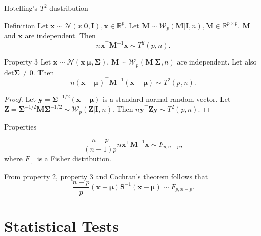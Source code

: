 \documentclass{beamer}
\begin{document}
\begin{frame}{Hotelling's $T^2$ dustribution}
    \begin{block}{Definition}
        Let $\mathbf{x} \sim \mathcal{N}(x|\mathbf{0}, \mathbf{I}), \mathbf{x}\in \mathbb{R}^p$.
        Let $\mathbf{M} \sim \mathcal{W}_p(\mathbf{M}|\mathbf{I}, n), \mathbf{M} \in \mathbb{R}^{p\times p}$.
        $\mathbf{M}$ and $\mathbf{x}$ are independent. Then
        \[
            n\mathbf{x}^\top\mathbf{M}^{-1}\mathbf{x} \sim T^2(p, n).
        \]
    \end{block}

    \begin{block}{Property 3}
        Let $\mathbf{x} \sim \mathcal{N}(\boldsymbol{x}|\boldsymbol{\mu}, \mathbf{\Sigma})$,
        $\mathbf{M} \sim \mathcal{W}_p(\mathbf{M}|\mathbf{\Sigma}, n)$ are independent.
        Let also $\mathrm{det}\mathbf{\Sigma} \not=0$. Then
        \[
            n(\mathbf{x} - \boldsymbol\mu)^\top\mathbf{M}^{-1}(\mathbf{x} - \boldsymbol\mu) \sim T^2(p, n).
        \]
    \end{block}
    \begin{proof}
        Let $\mathbf{y} = \mathbf{\Sigma}^{-1/2}(\mathbf{x} - \mathbf{\mu})$ is a standard normal random vector.
        Let $\mathbf{Z} = \mathbf{\Sigma}^{-1/2}\mathbf{M}\mathbf{\Sigma}^{-1/2} \sim \mathcal{W}_p(\mathbf{Z}|\mathbf{I}, n)$.
        Then $n\mathbf{y}^\top\mathbf{Z}\mathbf{y} \sim T^2(p, n)$. 
    \end{proof}
\end{frame}


\begin{frame}{Properties}
    \begin{Theorem}
        \[
            \frac{n - p}{(n - 1)p}n\mathbf{x}^\top\mathbf{M}^{-1}\mathbf{x} \sim F_{p, n-p},
        \]
        where $F_{., .}$ is a Fisher distribution.
    \end{Theorem}

    \begin{Corollary}
        From property 2, property 3 and Cochran's theorem follows that
        \[
            \frac{n - p}{p}(\overline{\mathbf{x}} - \boldsymbol\mu)\mathbf{S}^{-1}(\overline{\mathbf{x}} - \mathbf{\mu})
            \sim F_{p, n - p}.
        \]
    \end{Corollary}
\end{frame}


\section{Statistical Tests}
\end{document}
